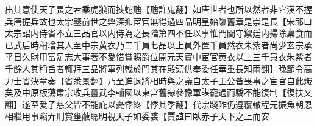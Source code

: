 出其意使天子畏之若乘虎狼而挾蛇虺【虺許鬼翻】如唐世者也所以然者非它漢不握兵唐握兵故也太宗鑒前世之弊深抑宦官無得過四品明皇始隳舊章是崇是長【宋祁曰太宗詔内侍省不立三品官以内侍為之長階第四不任以事惟門閤守禦廷内掃除稟食而已武后時稍增其人至中宗黄衣乃二千員七品以上員外置千員然衣朱紫者尚少玄宗承平日久財用富足志大事奢不愛惜賞賜爵位開元天寶中宦官黄衣以上三千員衣朱紫者千餘人其稱旨者輒拜三品將軍列戟於門其在殿頭供奉委任華重長知兩翻】晚節令高力士省決章奏【省悉景翻】乃至進退將相時與之議自太子王公皆畏事之宦官自此熾矣及中原板蕩肅宗收兵靈武李輔國以東宫舊隸參豫軍謀寵過而驕不能復制【復扶又翻】遂至愛子慈父皆不能庇以憂悸終【悸其季翻】代宗踐阼仍遵覆轍程元振魚朝恩相繼用事竊弄刑賞壅蔽聰明視天子如委裘【賈誼曰臥赤子天下之上而安
